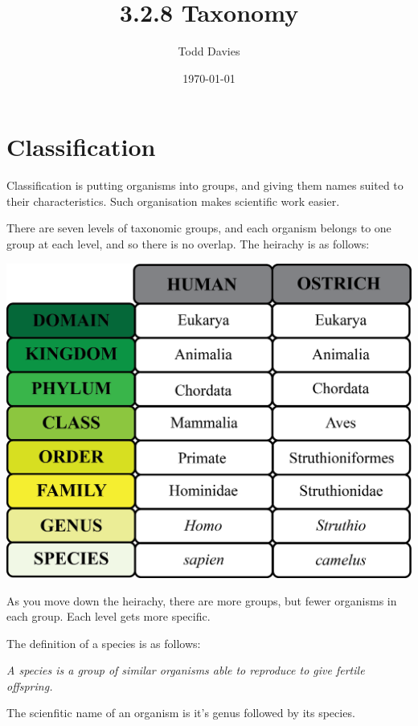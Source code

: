 \documentclass{article}
\author{Todd Davies}
\title{3.2.8 Taxonomy}
\date{\today}
\begin{document}
\lhead{\today}

\maketitle

\section*{Classification}
\thispagestyle{empty}

Classification is putting organisms into groups, and giving them names suited to
their characteristics. Such organisation makes scientific work easier.

There are seven levels of taxonomic groups, and each organism belongs to one
group at each level, and so there is no overlap. The heirachy is as follows:


\begin{center}
	\includegraphics[scale=0.4]{taxonomic_groups}
\end{center}

As you move down the heirachy, there are more groups, but fewer organisms in
each group. Each level gets more specific.

The definition of a species is as follows:

{\it A species is a group of similar organisms able to reproduce to give fertile
offspring.}

The scienfitic name of an organism is it's genus followed by its species.
\end{document}
